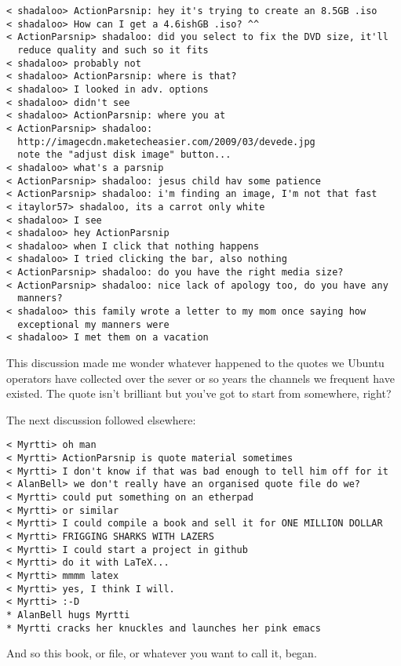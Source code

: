\documentclass[a4paper]{book}
\begin{document}
\begin{verbatim}
< shadaloo> ActionParsnip: hey it's trying to create an 8.5GB .iso
< shadaloo> How can I get a 4.6ishGB .iso? ^^
< ActionParsnip> shadaloo: did you select to fix the DVD size, it'll 
  reduce quality and such so it fits
< shadaloo> probably not
< shadaloo> ActionParsnip: where is that?
< shadaloo> I looked in adv. options
< shadaloo> didn't see
< shadaloo> ActionParsnip: where you at
< ActionParsnip> shadaloo: 
  http://imagecdn.maketecheasier.com/2009/03/devede.jpg
  note the "adjust disk image" button...
< shadaloo> what's a parsnip
< ActionParsnip> shadaloo: jesus child hav some patience
< ActionParsnip> shadaloo: i'm finding an image, I'm not that fast
< itaylor57> shadaloo, its a carrot only white
< shadaloo> I see
< shadaloo> hey ActionParsnip
< shadaloo> when I click that nothing happens
< shadaloo> I tried clicking the bar, also nothing
< ActionParsnip> shadaloo: do you have the right media size?
< ActionParsnip> shadaloo: nice lack of apology too, do you have any 
  manners?
< shadaloo> this family wrote a letter to my mom once saying how 
  exceptional my manners were
< shadaloo> I met them on a vacation
\end{verbatim}

This discussion made me wonder whatever happened to the quotes we Ubuntu
operators have collected over the sever or so years the channels we frequent
have existed. The quote isn't brilliant but you've got to start from somewhere, right?
\newpage{}

The next discussion followed elsewhere:
\begin{verbatim}
< Myrtti> oh man
< Myrtti> ActionParsnip is quote material sometimes
< Myrtti> I don't know if that was bad enough to tell him off for it
< AlanBell> we don't really have an organised quote file do we?
< Myrtti> could put something on an etherpad
< Myrtti> or similar
< Myrtti> I could compile a book and sell it for ONE MILLION DOLLAR
< Myrtti> FRIGGING SHARKS WITH LAZERS
< Myrtti> I could start a project in github
< Myrtti> do it with LaTeX...
< Myrtti> mmmm latex
< Myrtti> yes, I think I will.
< Myrtti> :-D
* AlanBell hugs Myrtti 
* Myrtti cracks her knuckles and launches her pink emacs
\end{verbatim}

And so this book, or file, or whatever you want to call it, began.
\newpage{}





\end{document}
